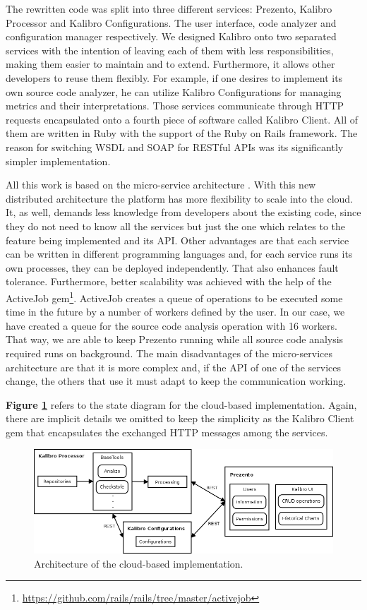 The rewritten code was split into three different services: Prezento, Kalibro Processor and Kalibro Configurations. The user interface, code analyzer and configuration manager respectively. We designed Kalibro onto two separated services with the intention of leaving each of them with less responsibilities, making them easier to maintain and to extend. Furthermore, it allows other developers to reuse them flexibly. For example, if one desires to implement its own source code analyzer, he can utilize Kalibro Configurations for managing metrics and their interpretations. Those services communicate through HTTP requests encapsulated onto a fourth piece of software called Kalibro Client. All of them are written in Ruby with the support of the Ruby on Rails framework. The reason for switching WSDL and SOAP for RESTful APIs was its significantly simpler implementation.

All this work is based on the micro-service architecture \cite{namiot2014micro}. With this new distributed architecture the platform has more flexibility to scale into the cloud. It, as well, demands less knowledge from developers about the existing code, since they do not need to know all the services but just the one which relates to the feature being implemented and its API. Other advantages are that each service can be written in different programming languages and, for each service runs its own processes, they can be deployed independently. That also enhances fault tolerance. Furthermore, better scalability was achieved with the help of the ActiveJob gem\footnote{\url{https://github.com/rails/rails/tree/master/activejob}}. ActiveJob creates a queue of operations to be executed some time in the future by a number of workers defined by the user. In our case, we have created a queue for the source code analysis operation with 16 workers. That way, we are able to keep Prezento running while all source code analysis required runs on background. The main disadvantages of the micro-services architecture are that it is more complex and, if the API of one of the services change, the others that use it must adapt to keep the communication working.

\textbf{Figure \ref{fig:mezuro-cloud-arch}} refers to the state diagram for the cloud-based implementation. Again, there are implicit details we omitted to keep the simplicity as the Kalibro Client gem that encapsulates the exchanged HTTP messages among the services.

\begin{figure}[htb]
  \centering
  \includegraphics[width=\textwidth]{images/mezuro-cloud-arch.png}
  \caption{Architecture of the cloud-based implementation.}
  \label{fig:mezuro-cloud-arch}
\end{figure}

